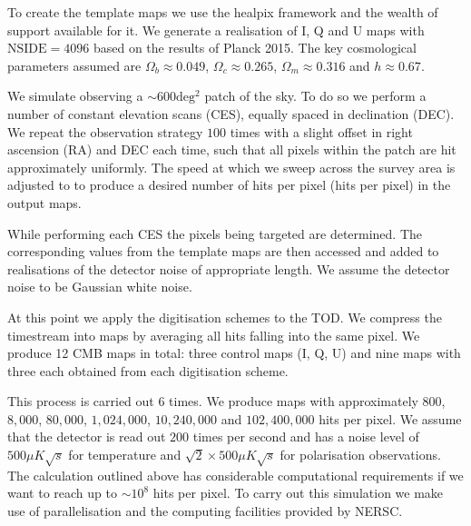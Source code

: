 \documentclass[apj]{emulateapj}
\begin{document}
To create the template maps we use the healpix framework and the wealth of support available for it. We generate a realisation of I, Q and U maps with $\mathrm{NSIDE} = 4096$ based on the results of Planck 2015. The key cosmological parameters assumed are $\Omega_b \approx 0.049 $, $\Omega_c \approx 0.265$, $\Omega_m \approx 0.316$ and $h \approx 0.67$.

We simulate observing a $\sim 600 \mathrm{deg^2}$ patch of the sky. To do so we perform a number of constant elevation scans (CES), equally spaced in declination (DEC). We repeat the observation strategy $100$ times with a slight offset in right ascension (RA) and DEC each time, such that all pixels within the patch are hit approximately uniformly. The speed at which we sweep across the survey area is adjusted to to produce a desired number of hits per pixel (hits per pixel) in the output maps.

While performing each CES the pixels being targeted are determined. The corresponding values from the template maps are then accessed and added to realisations of the detector noise of appropriate length. We assume the detector noise to be Gaussian white noise.

At this point we apply the digitisation schemes to the TOD. We compress the timestream into maps by averaging all hits falling into the same pixel. We produce 12 CMB maps in total: three control maps (I, Q, U) and nine maps with three each obtained from each digitisation scheme.

This process is carried out 6 times. We produce maps with approximately $800$, $8,000$, $80,000$, $1,024,000$, $10,240,000$ and $102,400,000$ hits per pixel. We assume that the detector is read out $200$ times per second and has a noise level of $500 \mu K \sqrt{s}$ for temperature and $\sqrt{2} \times 500 \mu K \sqrt{s}$ for polarisation observations. The calculation outlined above has considerable computational requirements if we want to reach up to $\sim 10^8$ hits per pixel. To carry out this simulation we make use of parallelisation and the computing facilities provided by NERSC.
\end{document}
